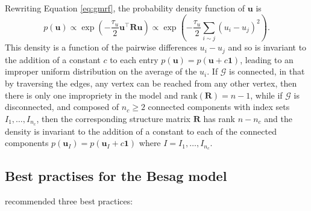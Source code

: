 \documentclass[a4paper, nobind]{templates/ociamthesis}
\newcommand{\bR}{\mathbf{R}}
\newcommand{\bu}{\mathbf{u}}
\begin{document}
Rewriting Equation \eqref{eq:gmrf}, the probability density function of \(\bu\) is
\begin{equation}
    p(\bu)
    \propto \exp \left( -\frac{\tau_u}{2} \bu^\top \bR \bu \right)
    \propto \exp \left( -\frac{\tau_u}{2} \sum_{i \sim j} (u_i - u_j)^2 \right). \label{eq:pdfu}
\end{equation}
This density is a function of the pairwise differences \(u_i - u_j\) and so is invariant to the addition of a constant \(c\) to each entry \(p(\bu) = p(\bu + c\mathbf{1})\), leading to an improper uniform distribution on the average of the \(u_i\).
If \(\mathcal{G}\) is connected, in that by traversing the edges, any vertex can be reached from any other vertex, then there is only one impropriety in the model and \(\text{rank}(\bR) = n - 1\), while if \(\mathcal{G}\) is disconnected, and composed of \(n_c \geq 2\) connected components with index sets \(I_1, \ldots, I_{n_c}\), then the corresponding structure matrix \(\bR\) has rank \(n - n_c\) and the density is invariant to the addition of a constant to each of the connected components \(p(\bu_{I}) = p(\bu_{I} + c\mathbf{1})\) where \(I = I_1, \ldots, I_{n_c}\).

\hypertarget{best-practises-for-the-besag-model}{%
\subsection{Best practises for the Besag model}\label{best-practises-for-the-besag-model}}

\textcite{freni2018note} recommended three best practices:
\end{document}
